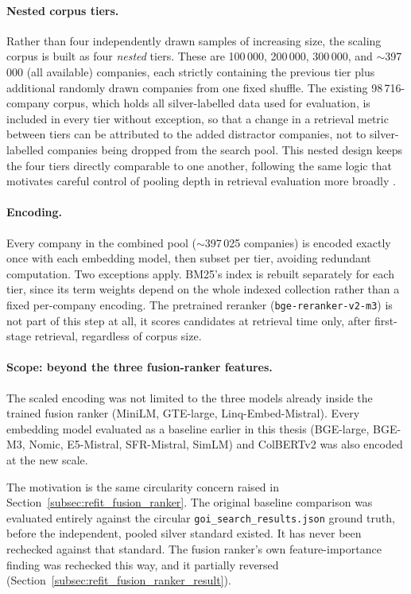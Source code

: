 \documentclass[a4paper,oneside,bibliography=totoc]{scrbook}
\begin{document}
\paragraph{Nested corpus tiers.} Rather than four independently drawn samples of increasing size, the scaling corpus is built as four \emph{nested} tiers. These are 100\,000, 200\,000, 300\,000, and $\sim$397\,000 (all available) companies, each strictly containing the previous tier plus additional randomly drawn companies from one fixed shuffle. The existing 98\,716-company corpus, which holds all silver-labelled data used for evaluation, is included in every tier without exception, so that a change in a retrieval metric between tiers can be attributed to the added distractor companies, not to silver-labelled companies being dropped from the search pool. This nested design keeps the four tiers directly comparable to one another, following the same logic that motivates careful control of pooling depth in retrieval evaluation more broadly \citep{lu2016effect}.

\paragraph{Encoding.} Every company in the combined pool ($\sim$397\,025 companies) is encoded exactly once with each embedding model, then subset per tier, avoiding redundant computation. Two exceptions apply. BM25's index is rebuilt separately for each tier, since its term weights depend on the whole indexed collection rather than a fixed per-company encoding. The pretrained reranker (\texttt{bge-reranker-v2-m3}) is not part of this step at all, it scores candidates at retrieval time only, after first-stage retrieval, regardless of corpus size.

\paragraph{Scope: beyond the three fusion-ranker features.} The scaled encoding was not limited to the three models already inside the trained fusion ranker (MiniLM, GTE-large, Linq-Embed-Mistral). Every embedding model evaluated as a baseline earlier in this thesis (BGE-large, BGE-M3, Nomic, E5-Mistral, SFR-Mistral, SimLM) and ColBERTv2 was also encoded at the new scale.

The motivation is the same circularity concern raised in Section~\ref{subsec:refit_fusion_ranker}. The original baseline comparison was evaluated entirely against the circular \texttt{goi\_search\_results.json} ground truth, before the independent, pooled silver standard existed. It has never been rechecked against that standard. The fusion ranker's own feature-importance finding was rechecked this way, and it partially reversed (Section~\ref{subsec:refit_fusion_ranker_result}).
\end{document}
